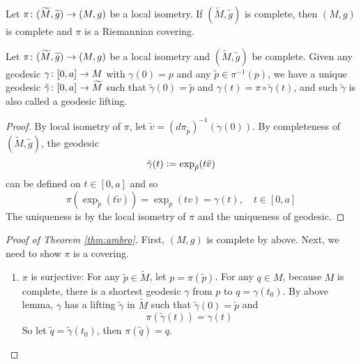 \begin{enumerate}[label=\arabic{*}.]
	\begin{thm}[Ambrose]\label{thm:ambro}
		Let $\pi \colon (\widetilde{M},\widetilde{g}) \rightarrow (M,g)$ be a local isometry. If $(\widetilde{M},\widetilde{g})$ is complete, then $(M,g)$ is complete and $\pi$ is a Riemannian covering.
	\end{thm}
	\begin{lem}
		Let $\pi \colon (\widetilde{M},\widetilde{g}) \rightarrow (M,g)$ be a local isometry and $(\widetilde{M},\widetilde{g})$ be complete. Given any geodesic $\gamma \colon [0,a] \rightarrow M$ with $\gamma(0) = p$ and any $\tilde{p} \in \pi^{-1}(p)$, we have a unique geodesic $\tilde{\gamma} \colon [0,a] \rightarrow \widetilde{M}$ such that $\tilde{\gamma}(0) = \tilde{p}$ and $\gamma(t) = \pi \circ \tilde{\gamma}(t)$, and such $\tilde{\gamma}$ is also called a geodesic lifting.
	\end{lem}
	\begin{proof}
		By local isometry of $\pi$, let $\tilde{v} = (d\pi_{\tilde{p}})^{-1}(\dot{\gamma}(0))$. By completeness of $(\widetilde{M},\widetilde{g})$, the geodesic
		\begin{equation*}
			\tilde{\gamma}(t) \vcentcolon= \exp_{\tilde{p}}(t\tilde{v})
		\end{equation*}
		can be defined on $t \in [0,a]$ and so
		\begin{equation*}
		 	\pi(\exp_{\tilde{p}}(t\tilde{v})) = \exp_p(tv) = \gamma(t),\quad t \in [0,a]
		\end{equation*}
		The uniqueness is by the local isometry of $\pi$ and the uniqueness of geodesic.
	\end{proof}

	\begin{proof}[Proof of Theorem \ref{thm:ambro}]
		First, $(M,g)$ is complete by above. Next, we need to show $\pi$ is a covering.
		\begin{enumerate}[label=(\arabic{*})]
			\item $\pi$ is surjective: For any $\tilde{p} \in \widetilde{M}$, let $p = \pi(\tilde{p})$. For any $q \in M$, because $M$ is complete, there is a shortest geodesic $\gamma$ from $p$ to $q = \gamma(t_0)$. By above lemma, $\gamma$ has a lifting $\tilde{\gamma}$ in $\widetilde{M}$ such that $\tilde{\gamma}(0) = \tilde{p}$ and
			\begin{equation*}
				\pi(\tilde{\gamma}(t)) = {\gamma}(t)
			\end{equation*}
			So let $\tilde{q} = \tilde{\gamma}(t_0)$, then $\pi(\tilde{q}) = q$.


\end{enumerate}
\end{proof}
\end{enumerate}
